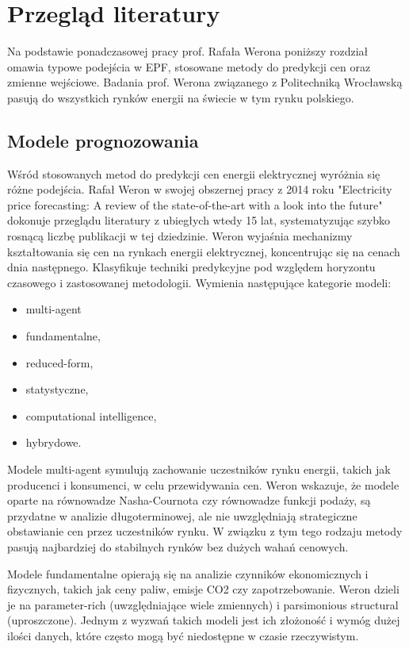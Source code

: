 \chapter{Przegląd literatury}
\label{ch:literatura}
Na podstawie ponadczasowej pracy prof. Rafała Werona poniższy rozdział omawia typowe podejścia w EPF, stosowane metody do predykcji cen oraz zmienne wejściowe. Badania prof. Werona związanego z Politechniką Wrocławską pasują do wszystkich rynków energii na świecie w tym rynku polskiego.

\section{Modele prognozowania}
\label{sec:modele_prognozowania_literatura}

Wśród stosowanych metod do predykcji cen energii elektrycznej wyróżnia się różne podejścia. Rafał Weron w swojej obszernej pracy z 2014 roku "Electricity price forecasting: A review of the state-of-the-art with a look into the future" \cite{WERON20141030} dokonuje przeglądu literatury z ubiegłych wtedy 15 lat, systematyzując szybko rosnącą liczbę publikacji w tej dziedzinie. Weron wyjaśnia mechanizmy kształtowania się cen na rynkach energii elektrycznej, koncentrując się na cenach dnia następnego. Klasyfikuje techniki predykcyjne pod względem horyzontu czasowego i zastosowanej metodologii. Wymienia następujące kategorie modeli: 
\begin{itemize}
    \item multi-agent
    \item fundamentalne,
    \item reduced-form,
    \item statystyczne,
    \item computational intelligence,
    \item hybrydowe.
\end{itemize}

Modele multi-agent symulują zachowanie uczestników rynku energii, takich jak producenci i konsumenci, w celu przewidywania cen. Weron \cite{WERON20141030} wskazuje, że modele oparte na równowadze Nasha-Cournota czy równowadze funkcji podaży, są przydatne w analizie długoterminowej, ale nie uwzględniają strategiczne obstawianie cen przez uczestników rynku. W związku z tym tego rodzaju metody pasują najbardziej do stabilnych rynków bez dużych wahań cenowych. 

Modele fundamentalne opierają się na analizie czynników ekonomicznych i fizycznych, takich jak ceny paliw, emisje CO2 czy zapotrzebowanie. Weron \cite{WERON20141030} dzieli je na parameter-rich (uwzględniające wiele zmiennych) i parsimonious structural (uproszczone). Jednym z wyzwań takich modeli jest ich złożoność i wymóg dużej ilości danych, które często mogą być niedostępne w czasie rzeczywistym. 

